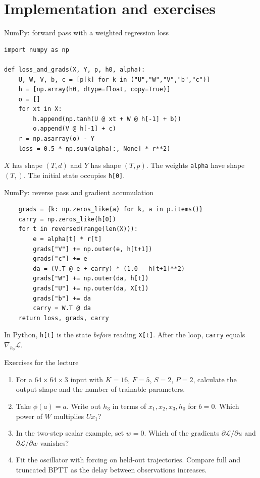 \documentclass[aspectratio=169,11pt]{beamer}
\begin{document}
\section{Implementation and exercises}
\begin{frame}[fragile]{NumPy: forward pass with a weighted regression loss}
\begin{lstlisting}
import numpy as np

def loss_and_grads(X, Y, p, h0, alpha):
    U, W, V, b, c = [p[k] for k in ("U","W","V","b","c")]
    h = [np.array(h0, dtype=float, copy=True)]
    o = []
    for xt in X:
        h.append(np.tanh(U @ xt + W @ h[-1] + b))
        o.append(V @ h[-1] + c)
    r = np.asarray(o) - Y
    loss = 0.5 * np.sum(alpha[:, None] * r**2)
\end{lstlisting}
$X$ has shape $(T,d)$ and $Y$ has shape $(T,p)$. The weights \texttt{alpha}
have shape $(T,)$. The initial state occupies \texttt{h[0]}.
\end{frame}
\begin{frame}[fragile]{NumPy: reverse pass and gradient accumulation}
\begin{lstlisting}
    grads = {k: np.zeros_like(a) for k, a in p.items()}
    carry = np.zeros_like(h[0])
    for t in reversed(range(len(X))):
        e = alpha[t] * r[t]
        grads["V"] += np.outer(e, h[t+1])
        grads["c"] += e
        da = (V.T @ e + carry) * (1.0 - h[t+1]**2)
        grads["W"] += np.outer(da, h[t])
        grads["U"] += np.outer(da, X[t])
        grads["b"] += da
        carry = W.T @ da
    return loss, grads, carry
\end{lstlisting}
In Python, \texttt{h[t]} is the state \emph{before} reading \texttt{X[t]}.
After the loop, \texttt{carry} equals $\nabla_{h_0}\mathcal L$.
\end{frame}
\begin{frame}{Exercises for the lecture}
\begin{enumerate}
\item For a $64\times64\times3$ input with $K=16$, $F=5$, $S=2$, $P=2$,
calculate the output shape and the number of trainable parameters.
\item Take $\phi(a)=a$. Write out $h_3$ in terms of $x_1,x_2,x_3,h_0$ for
$b=0$. Which power of $W$ multiplies $Ux_1$?
\item In the two-step scalar example, set $w=0$. Which of the gradients
$\partial\mathcal L/\partial u$ and $\partial\mathcal L/\partial w$ vanishes?
\item Fit the oscillator with forcing on held-out trajectories. Compare
full and truncated BPTT as the delay between observations increases.
\end{enumerate}
\end{frame}
\end{document}
